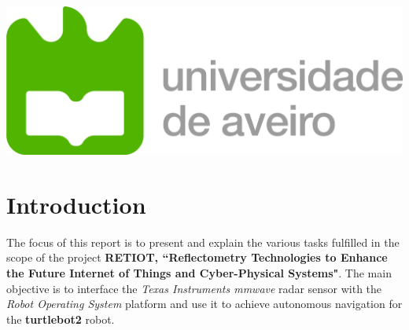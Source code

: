 \documentclass[12pt]{article}
\begin{document}
\begin{titlepage}


\bigskip
\includegraphics[scale=0.4]{ua_logo.png} %
 

\vfill %

\end{titlepage}
\tableofcontents
\newpage

\section{Introduction}
The focus of this report is to present and explain the various tasks fulfilled in the scope of the project \textbf{RETIOT, “Reflectometry Technologies to Enhance the Future Internet of Things and Cyber-Physical Systems"}. The main objective is to interface the \textit{Texas Instruments mmwave} radar sensor with the \textit{Robot Operating System} platform and use it to achieve autonomous navigation for the \textbf{turtlebot2} robot.
\end{document}
